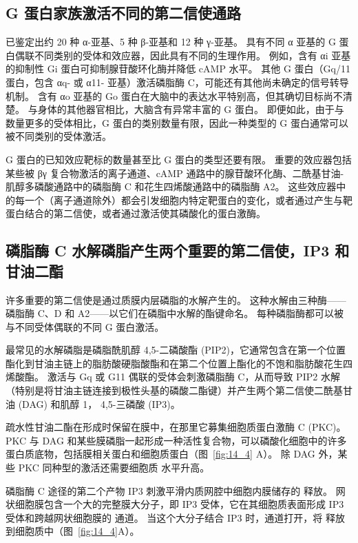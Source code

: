 \subsection{G 蛋白家族激活不同的第二信使通路}

已鉴定出约 20 种 α-亚基、5 种 β-亚基和 12 种 γ-亚基。
具有不同 α 亚基的 G 蛋白偶联不同类别的受体和效应器，因此具有不同的生理作用。
例如，含有 αi 亚基的抑制性 Gi 蛋白可抑制腺苷酸环化酶并降低 cAMP 水平。
其他 G 蛋白（Gq/11 蛋白，包含 αq- 或 α11- 亚基）激活磷脂酶 C，可能还有其他尚未确定的信号转导机制。
含有 αo 亚基的 Go 蛋白在大脑中的表达水平特别高，但其确切目标尚不清楚。
与身体的其他器官相比，大脑含有异常丰富的 G 蛋白。
即便如此，由于与数量更多的受体相比，G 蛋白的类别数量有限，因此一种类型的 G 蛋白通常可以被不同类别的受体激活。


G 蛋白的已知效应靶标的数量甚至比 G 蛋白的类型还要有限。
重要的效应器包括某些被 βγ 复合物激活的离子通道、cAMP 通路中的腺苷酸环化酶、二酰基甘油-肌醇多磷酸通路中的磷脂酶 C 和花生四烯酸通路中的磷脂酶 A2。
这些效应器中的每一个（离子通道除外）都会引发细胞内特定靶蛋白的变化，或者通过产生与靶蛋白结合的第二信使，或者通过激活使其磷酸化的蛋白激酶。



\subsection{磷脂酶 C 水解磷脂产生两个重要的第二信使，IP3 和甘油二酯}

许多重要的第二信使是通过质膜内层磷脂的水解产生的。 
这种水解由三种酶——磷脂酶 C、D 和 A2——以它们在磷脂中水解的酯键命名。
每种磷脂酶都可以被与不同受体偶联的不同 G 蛋白激活。


最常见的水解磷脂是磷脂酰肌醇 4,5-二磷酸酯 (PIP2)，它通常包含在第一个位置酯化到甘油主链上的脂肪酸硬脂酸酯和在第二个位置上酯化的不饱和脂肪酸花生四烯酸酯。
激活与 Gq 或 G11 偶联的受体会刺激磷脂酶 C，从而导致 PIP2 水解（特别是将甘油主链连接到极性头基的磷酸二酯键）并产生两个第二信使二酰基甘油 (DAG) 和肌醇 1， 4,5-三磷酸 (IP3)。


疏水性甘油二酯在形成时保留在膜中，在那里它募集细胞质蛋白激酶 C (PKC)。
PKC 与 DAG 和某些膜磷脂一起形成一种活性复合物，可以磷酸化细胞中的许多蛋白质底物，包括膜相关蛋白和细胞质蛋白（图~\ref{fig:14_4} A）。
除 DAG 外，某些 PKC 同种型的激活还需要细胞质  水平升高。


磷脂酶 C 途径的第二个产物 IP3 刺激平滑内质网腔中细胞内膜储存的  释放。
网状细胞膜包含一个大的完整膜大分子，即 IP3 受体，它在其细胞质表面形成 IP3 受体和跨越网状细胞膜的  通道。
当这个大分子结合 IP3 时，通道打开，将  释放到细胞质中（图~\ref{fig:14_4}A）。


